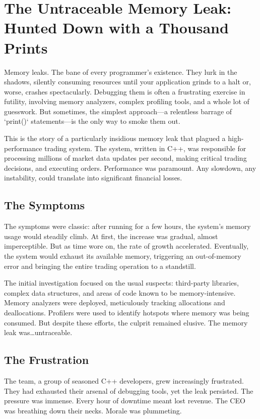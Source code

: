 \documentclass{article}
\begin{document}
{{{{\section*{The Untraceable Memory Leak: Hunted Down with a Thousand Prints}

Memory leaks. The bane of every programmer's existence. They lurk in the shadows, silently consuming resources until your application grinds to a halt or, worse, crashes spectacularly. Debugging them is often a frustrating exercise in futility, involving memory analyzers, complex profiling tools, and a whole lot of guesswork. But sometimes, the simplest approach—a relentless barrage of `print()` statements—is the only way to smoke them out.

This is the story of a particularly insidious memory leak that plagued a high-performance trading system. The system, written in C++, was responsible for processing millions of market data updates per second, making critical trading decisions, and executing orders. Performance was paramount. Any slowdown, any instability, could translate into significant financial losses.

\subsection*{The Symptoms}

The symptoms were classic: after running for a few hours, the system's memory usage would steadily climb. At first, the increase was gradual, almost imperceptible. But as time wore on, the rate of growth accelerated. Eventually, the system would exhaust its available memory, triggering an out-of-memory error and bringing the entire trading operation to a standstill.

The initial investigation focused on the usual suspects: third-party libraries, complex data structures, and areas of code known to be memory-intensive. Memory analyzers were deployed, meticulously tracking allocations and deallocations. Profilers were used to identify hotspots where memory was being consumed. But despite these efforts, the culprit remained elusive. The memory leak was…untraceable.

\subsection*{The Frustration}

The team, a group of seasoned C++ developers, grew increasingly frustrated. They had exhausted their arsenal of debugging tools, yet the leak persisted. The pressure was immense. Every hour of downtime meant lost revenue. The CEO was breathing down their necks. Morale was plummeting.

}}}}
\end{document}
